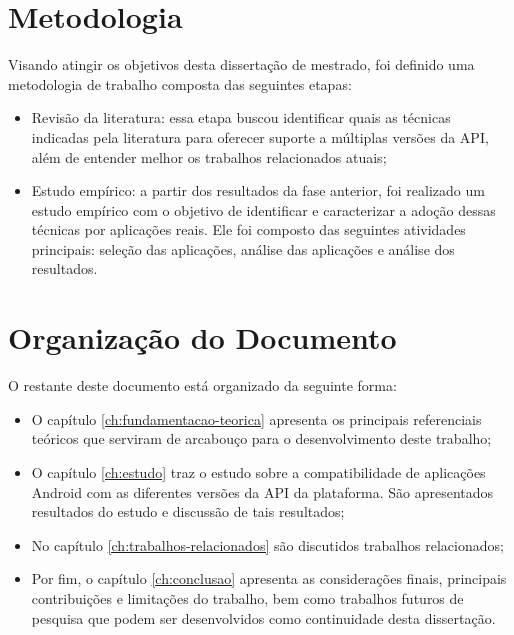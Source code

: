\section{Metodologia} \label{sec:metodologia}

Visando atingir os objetivos desta dissertação de mestrado, foi definido uma
metodologia de trabalho composta das seguintes etapas:
\begin{itemize}
	\item Revisão da literatura: essa etapa buscou identificar quais as técnicas
	indicadas pela literatura para oferecer suporte a múltiplas versões da API,
	além de entender melhor os trabalhos relacionados atuais;
	\item Estudo empírico: a partir dos resultados da fase anterior, foi realizado
	um estudo empírico com o objetivo de identificar e caracterizar a adoção dessas
	técnicas por aplicações reais. Ele foi composto das seguintes atividades principais:
	seleção das aplicações, análise das aplicações e análise dos resultados.
\end{itemize}


\section{Organização do Documento} \label{sec:organizacao-trabalho}

O restante deste documento está organizado da seguinte forma:
\begin{itemize}
    \item O capítulo \ref{ch:fundamentacao-teorica} apresenta os principais
    referenciais teóricos que serviram de arcabouço para o desenvolvimento
    deste trabalho;
    \item O capítulo \ref{ch:estudo}  traz o estudo sobre a compatibilidade
    de aplicações Android com as diferentes versões da API da plataforma. São
    apresentados resultados do estudo e discussão de tais resultados;
    \item No capítulo \ref{ch:trabalhos-relacionados} são discutidos trabalhos
    relacionados;
    \item Por fim, o capítulo \ref{ch:conclusao} apresenta as considerações finais,
    principais contribuições e limitações do trabalho, bem como trabalhos futuros
    de pesquisa que podem ser desenvolvidos como continuidade desta dissertação.
\end{itemize}
